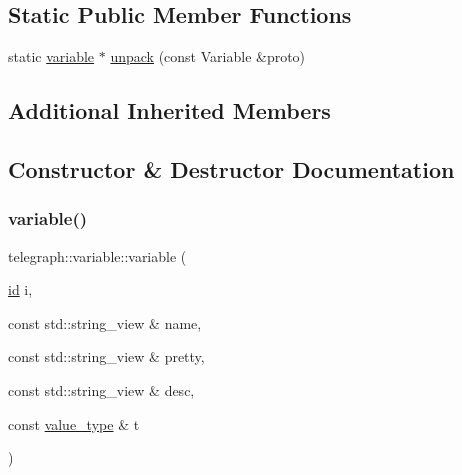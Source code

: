 \subsection*{Static Public Member Functions}
\begin{DoxyCompactItemize}
\item 
static \hyperlink{classtelegraph_1_1variable}{variable} $\ast$ \hyperlink{classtelegraph_1_1variable_aeea48695245eddd386bcc44719111ff2}{unpack} (const Variable \&proto)
\end{DoxyCompactItemize}
\subsection*{Additional Inherited Members}


\subsection{Constructor \& Destructor Documentation}
\mbox{\label{classtelegraph_1_1variable_a83fd573aea4f3377e067a2bad74a6fbf}} 
\subsubsection{\texorpdfstring{variable()}{variable()}\hspace{0.1cm}{\footnotesize\ttfamily [1/2]}}
{\footnotesize\ttfamily telegraph\+::variable\+::variable (\begin{DoxyParamCaption}\item[{\hyperlink{classtelegraph_1_1node_a90bc576d668ed141d5354a06aa9c8d9a}{id}}]{i,  }\item[{const std\+::string\+\_\+view \&}]{name,  }\item[{const std\+::string\+\_\+view \&}]{pretty,  }\item[{const std\+::string\+\_\+view \&}]{desc,  }\item[{const \hyperlink{classtelegraph_1_1value__type}{value\+\_\+type} \&}]{t }\end{DoxyParamCaption})\hspace{0.3cm}{\ttfamily [inline]}}

\mbox{\label{classtelegraph_1_1variable_a6fb4602379330bbafba7628f118a5238}} 
